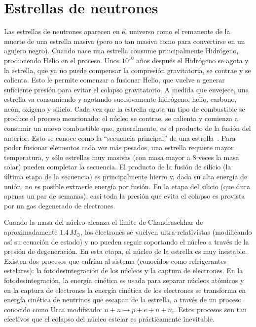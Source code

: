 \section{Estrellas de neutrones}\label{sc:intro}

Las estrellas de neutrones aparecen en el universo como el remanente de la muerte de una estrella masiva (pero no tan masiva como para convertirse en un agujero negro).
Cuando nace una estrella consume principalmente Hidrógeno, produciendo Helio en el proceso.
Unos $10^{10}$ años después el Hidrógeno se agota y la estrella, que ya no puede compensar la compresión gravitatoria, se contrae y se calienta.
Esto le permite comenzar a fusionar Helio, que vuelve a generar suficiente presión para evitar el colapso gravitatorio.
A medida que envejece, una estrella va consumiendo y agotando sucesivamente hidrógeno, helio, carbono, neón, oxígeno y silicio.
Cada vez que la estrella agota un tipo de combustible se produce el proceso mencionado: el núcleo se contrae, se calienta y comienza a consumir un nuevo combustible que, generalmente, es el producto de la fusión del anterior.
Esto se conoce como la ``secuencia principal'' de una estrella~\cite{woosley_physics_2005}.
Para poder fusionar elementos cada vez más pesados, una estrella requiere mayor temperatura, y sólo estrellas muy masivas (con masa mayor a 8 veces la masa solar) pueden completar la secuencia.
El producto de la fusión de silicio (la última etapa de la secuencia) es principalmente hierro y, dada su alta energía de unión, no es posible extraerle energía por fusión.
En la etapa del silicio (que dura apenas un par de semanas), casi toda la presión que evita el colapso es provista por un gas degenerado de electrones.

Cuando la masa del núcleo alcanza el límite de Chandrasekhar de aproximadamente $1.4\,M_\odot$, los electrones se vuelven ultra-relativistas (modificando así su ecuación de estado) y no pueden seguir soportando el núcleo a través de la presión de degeneración.
En esta etapa, el núcleo de la estrella es muy inestable.
Existen dos procesos que enfrían al sistema (conocidos como refrigerantes estelares): la fotodesintegración de los núcleos y la captura de electrones.
En la fotodesintegración, la energía cinética es usada para separar núcleos atómicos y en la captura de electrones la energía cinética de los electrones se transforma en energía cinética de neutrinos que escapan de la estrella, a través de un proceso conocido como Urca modificado: $n + n \rightarrow p + e + n + \bar{\nu}_e$.
Estos procesos son tan efectivos que el colapso del núcleo estelar es prácticamente inevitable.

